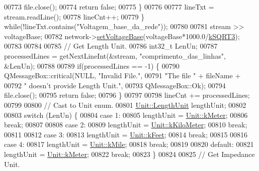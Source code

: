 \begin{DoxyCode}
00773       file.close();
00774       \textcolor{keywordflow}{return} \textcolor{keyword}{false};
00775     \}
00776 
00777     lineTxt = stream.readLine();
00778     lineCnt++;
00779   \} \textcolor{keywordflow}{while}(!lineTxt.contains(\textcolor{stringliteral}{"Voltagem\_base\_da\_rede"}));
00780 
00781   stream >> voltageBase;
00782   network->\hyperlink{group___models_gac2787bb9c323716baa2e6fba06136f2b}{setVoltageBase}(voltageBase*1000.0/\hyperlink{math__constants_8h_a987f07b0b550988e3f3f9fb36d74142e}{kSQRT3});
00783 
00784 
00785   \textcolor{comment}{// Get Length Unit.}
00786   int32\_t LenUn;
00787   processedLines = getNextLineInt(&stream, \textcolor{stringliteral}{"comprimento\_das\_linhas"}, &LenUn);
00788 
00789   \textcolor{keywordflow}{if}(processedLines == -1) \{
00790     QMessageBox::critical(NULL, \textcolor{stringliteral}{"Invalid File."},
00791                           \textcolor{stringliteral}{"The file "} + fileName +
00792                           \textcolor{stringliteral}{" doesn't provide Length Unit."},
00793                           QMessageBox::Ok);
00794     file.close();
00795     \textcolor{keywordflow}{return} \textcolor{keyword}{false};
00796   \}
00797 
00798   lineCnt += processedLines;
00799 
00800   \textcolor{comment}{// Cast to Unit enum.}
00801   \hyperlink{class_unit_a8c8921f7b225ad6063b1cb573425b9a0}{Unit::LengthUnit} lengthUnit;
00802 
00803   \textcolor{keywordflow}{switch} (LenUn) \{
00804   \textcolor{keywordflow}{case} 1:
00805     lengthUnit = \hyperlink{class_unit_a8c8921f7b225ad6063b1cb573425b9a0abfa41ebe7ee649a1f02c9b8ae570434b}{Unit::kMeter};
00806     \textcolor{keywordflow}{break};
00807 
00808   \textcolor{keywordflow}{case} 2:
00809     lengthUnit = \hyperlink{class_unit_a8c8921f7b225ad6063b1cb573425b9a0a1c04f3dd196dbe1832a2658215b0d919}{Unit::kKiloMeter};
00810     \textcolor{keywordflow}{break};
00811 
00812   \textcolor{keywordflow}{case} 3:
00813     lengthUnit = \hyperlink{class_unit_a8c8921f7b225ad6063b1cb573425b9a0a9ac9b167b0ebce477fb53d6ace04ddc8}{Unit::kFeet};
00814     \textcolor{keywordflow}{break};
00815 
00816   \textcolor{keywordflow}{case} 4:
00817     lengthUnit = \hyperlink{class_unit_a8c8921f7b225ad6063b1cb573425b9a0a2ebde742068bbee0510de32fbb4cd724}{Unit::kMile};
00818     \textcolor{keywordflow}{break};
00819 
00820   \textcolor{keywordflow}{default}:
00821     lengthUnit = \hyperlink{class_unit_a8c8921f7b225ad6063b1cb573425b9a0abfa41ebe7ee649a1f02c9b8ae570434b}{Unit::kMeter};
00822     \textcolor{keywordflow}{break};
00823   \}
00824 
00825   \textcolor{comment}{// Get Impedance Unit.}

\end{DoxyCode}
